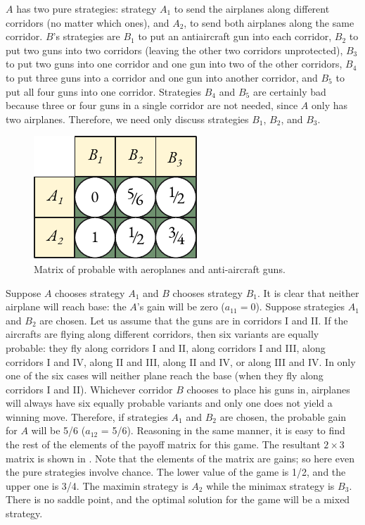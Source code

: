 $A$ has two pure strategies: strategy $A_{1}$ to send the airplanes along
different corridors (no matter which ones), and $A_{2}$, to send both
airplanes along the same corridor. $B$'s strategies are $B_{1}$ to put an
antiaircraft gun into each corridor, $B_{2}$ to put two guns into two
corridors (leaving the other two corridors unprotected), $B_{3}$ to put two
guns into one corridor and one gun into two of the other corridors, $B_{4}$
to put three guns into a corridor and one gun into another corridor,
and $B_{5}$ to put all four guns into one corridor. Strategies $B_{4}$ and $B_{5}$ are certainly bad because three or four guns in a single corridor are not
needed, since $A$ only has two airplanes. Therefore, we need only discuss
strategies $B_{1}$, $B_{2}$, and $B_{3}$.

 \begin{figure}
 \centering
 \includegraphics[width=0.7\linewidth]{figures/aa-matrix.pdf}
\caption{Matrix of probable with aeroplanes and anti-aircraft guns.\label{aa-matrix}}
 \end{figure}
Suppose $A$ chooses strategy $A_{1}$ and $B$ chooses strategy $B_{1}$. It is clear that neither airplane will reach base: the $A$'s gain will be zero ($a_{11}=0$). Suppose strategies $A_{1}$ and $B_{2}$ are chosen. Let us assume that the guns are in corridors I and II. If the aircrafts are flying along different corridors, then six variants are equally probable: they fly along corridors I and II, along corridors I and III, along corridors I and IV, along II and III, along II and IV, or along III and IV. In only one of the six cases will neither plane reach the base (when they fly along corridors I and II). Whichever corridor $B$ chooses to place his guns in, airplanes will always have six equally probable variants and only one does not yield a winning move. Therefore, if strategies $A_{1}$ and 
$B_{2}$ are chosen, the probable gain for $A$ will be 5/6 ($a_{12}$ = 5/6). Reasoning in the same manner, it is easy to find the rest of the elements of the
payoff matrix for this game. The resultant $2 \times 3$ matrix is shown in
. Note that the elements of the matrix are  gains; so here even the pure strategies involve chance. The lower value of the
game is 1/2, and the upper one is 3/4. The maximin strategy is $A_{2}$ while
the minimax strategy is $B_{3}$. There is no saddle point, and the optimal
solution for the game will be a mixed strategy.

